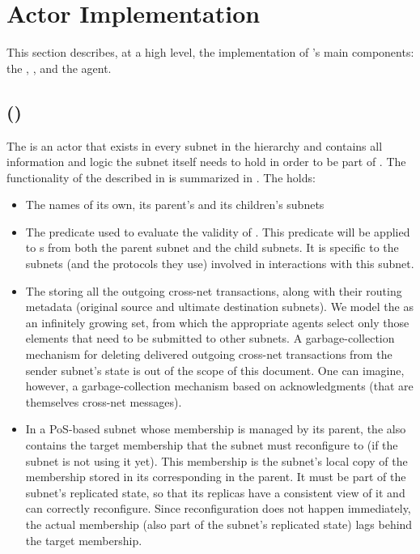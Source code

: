  \section{\ipc Actor Implementation}
 \label{sec:components}


This section describes, at a high level, the implementation of \ipc's main components: the \gw, \sa, and the \ipc agent.

\subsection{\gwFull (\gw)}
The \gw is an actor that exists in every subnet in the \ipc hierarchy and contains all information and logic the subnet itself needs to hold in order to be part of \ipc.
The functionality of the \gw described in  is summarized in .
The \gw holds:
\begin{itemize}
    \item The names of its own, its parent's and its children's subnets

    \item The predicate used to evaluate the validity of \pofsFull.
    This predicate will be applied to {\pof}s from both the parent subnet and the child subnets.
    It is specific to the subnets (and the protocols they use) involved in interactions with this subnet.

    \item The \postoffice storing all the outgoing cross-net transactions, along with their routing metadata (original source and ultimate destination subnets).
    We model the \postoffice as an infinitely growing set, from which the appropriate \ipc agents select only those elements that need to be submitted to other subnets.
    A garbage-collection mechanism for deleting delivered outgoing cross-net transactions from the sender subnet's state is out of the scope of this document.
    One can imagine, however, a garbage-collection mechanism based on acknowledgments (that are themselves cross-net messages).

    \item In a PoS-based subnet whose membership is managed by its parent, the \gw also contains the target membership that the subnet must reconfigure to (if the subnet is not using it yet).
    This membership is the subnet's local copy of the membership stored in its corresponding \saFull in the parent.
    It must be part of the subnet's replicated state, so that its replicas have a consistent view of it and can correctly reconfigure.
    Since reconfiguration does not happen immediately, the actual membership (also part of the subnet's replicated state) lags behind the target membership.

\end{itemize}

